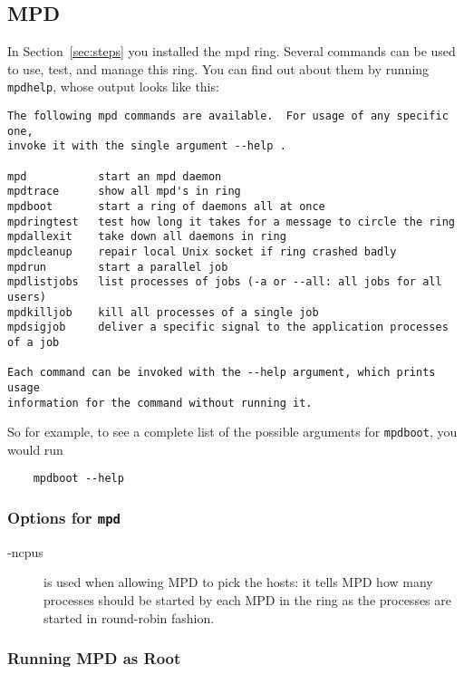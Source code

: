 \documentclass[dvipdfm,11pt]{article}
\begin{document}
\subsection{MPD}
\label{sec:mpd}

In Section~\ref{sec:steps} you installed the mpd ring.  Several commands
can be used to use, test, and manage this ring.  You can find out about
them by running \texttt{mpdhelp}, whose output looks like this:

\begin{verbatim}
The following mpd commands are available.  For usage of any specific one,
invoke it with the single argument --help .

mpd           start an mpd daemon
mpdtrace      show all mpd's in ring
mpdboot       start a ring of daemons all at once
mpdringtest   test how long it takes for a message to circle the ring 
mpdallexit    take down all daemons in ring
mpdcleanup    repair local Unix socket if ring crashed badly
mpdrun        start a parallel job
mpdlistjobs   list processes of jobs (-a or --all: all jobs for all users)
mpdkilljob    kill all processes of a single job
mpdsigjob     deliver a specific signal to the application processes of a job

Each command can be invoked with the --help argument, which prints usage
information for the command without running it.
\end{verbatim}
So for example, to see a complete list of the possible arguments for
\texttt{mpdboot}, you would run
\begin{verbatim}
    mpdboot --help
\end{verbatim}


\subsubsection{Options for \texttt{mpd}}

\begin{description}
\item[-ncpus] is used when allowing MPD to pick the hosts: it tells MPD
  how many processes should be started by each MPD in the ring as the
  processes are started in round-robin fashion.
\end{description}

\subsubsection{Running MPD as Root}
\label{sec:mpd-root}
\end{document}
